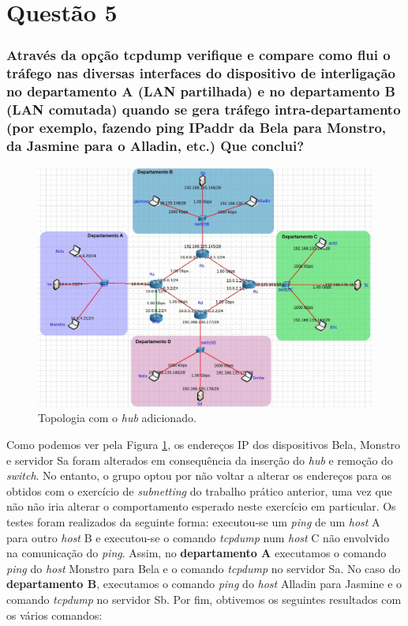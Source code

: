 

\section{Questão 5}

\subsubsection{Através da opção tcpdump verifique e compare como flui o tráfego nas diversas interfaces do dispositivo de interligação no departamento A (LAN partilhada) e no departamento B (LAN comutada) quando se gera tráfego intra-departamento (por exemplo, fazendo ping IPaddr da Bela para Monstro, da Jasmine para o Alladin, etc.) Que conclui?}

    \begin{figure}[H]
    \includegraphics[width=\linewidth]{prints/Questao5/topologia.jpg}
    \caption{Topologia com o \textit{hub} adicionado.} 
    \label{questao5-topologia}
    \end{figure}
    

    \par Como podemos ver pela Figura \ref{questao5-topologia}, os endereços IP dos dispositivos Bela, Monstro e servidor Sa foram alterados em consequência da inserção do \textit{hub} e remoção do \textit{switch}. No entanto, o grupo optou por não voltar a alterar os endereços para os obtidos com o exercício de \textit{subnetting} do trabalho prático anterior, uma vez que não não iria alterar o comportamento esperado neste exercício em particular. Os testes foram realizados da seguinte forma: executou-se um \textit{ping} de um \textit{host} A para outro \textit{host} B e executou-se o comando \textit{tcpdump} num \textit{host} C não envolvido na comunicação do \textit{ping}. Assim, no \textbf{departamento A} executamos o comando \textit{ping} do \textit{host} Monstro para Bela e o comando \textit{tcpdump} no servidor Sa. No caso do \textbf{departamento B}, executamos o comando \textit{ping} do \textit{host} Alladin para Jasmine e o comando \textit{tcpdump} no servidor Sb. Por fim, obtivemos os seguintes resultados com os vários comandos:
            
